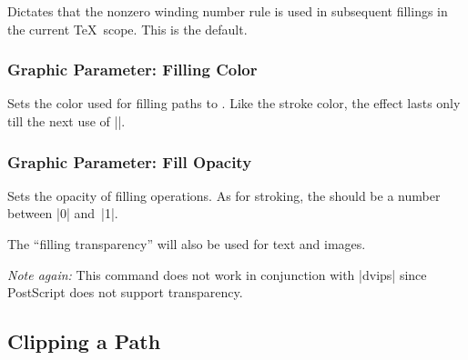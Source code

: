 \begin{command}{\pgfsetnonzerorule}
  Dictates that the nonzero winding number rule is used in subsequent
  fillings in the current \TeX\ scope. This is the default.

\begin{codeexample}[]
\begin{pgfpicture}
  \pgfsetnonzerorule
  \pgfpathcircle{\pgfpoint{0mm}{0cm}}{7mm}
  \pgfpathcircle{\pgfpoint{5mm}{0cm}}{7mm}
\end{pgfpicture}
\end{codeexample}
\end{command}

\subsubsection{Graphic Parameter: Filling Color}

\begin{command}{\pgfsetfillcolor{}}
  Sets the color used for filling paths to . Like the
  stroke color, the effect lasts only till the next use of |\color|. 
\end{command}


\subsubsection{Graphic Parameter: Fill Opacity}

\begin{command}{\pgfsetfillopacity{}}
  Sets the opacity of filling operations. As for stroking, the
   should be a number between |0| and~|1|.

  The ``filling transparency'' will also be used for text and images.  
  
  \emph{Note again:} This command does not work in conjunction with
  |dvips| since PostScript does not support transparency.
  
\begin{codeexample}[]
\end{codeexample}
\end{command}

\subsection{Clipping a Path}
\label{section-clip}

